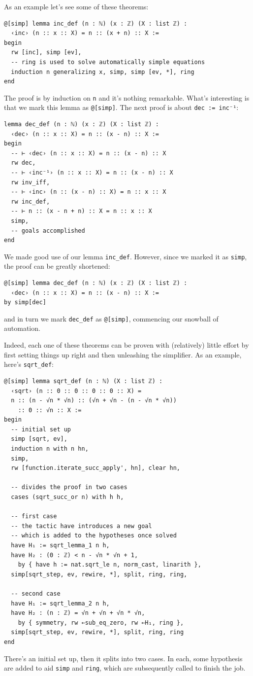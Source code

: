 \documentclass[oneside]{book}
\theoremstyle{definition}
\theoremstyle{remark}
\theoremstyle{plain}
\begin{document}
As an example let's see some of these theorems:
\begin{lstlisting}
@[simp] lemma inc_def (n : ℕ) (x : ℤ) (X : list ℤ) :
  ‹inc› (n :: x :: X) = n :: (x + n) :: X :=
begin
  rw [inc], simp [ev],
  -- ring is used to solve automatically simple equations 
  induction n generalizing x, simp, simp [ev, *], ring
end
\end{lstlisting}
The proof is by induction on \lstinline{n} and it's nothing remarkable.
What's interesting is that we mark this lemma as \lstinline{@[simp]}.
The next proof is about \lstinline{dec := inc⁻¹}:
\begin{lstlisting}
lemma dec_def (n : ℕ) (x : ℤ) (X : list ℤ) :
  ‹dec› (n :: x :: X) = n :: (x - n) :: X :=
begin
  -- ⊢ ‹dec› (n :: x :: X) = n :: (x - n) :: X
  rw dec,
  -- ⊢ ‹inc⁻¹› (n :: x :: X) = n :: (x - n) :: X
  rw inv_iff,
  -- ⊢ ‹inc› (n :: (x - n) :: X) = n :: x :: X
  rw inc_def,
  -- ⊢ n :: (x - n + n) :: X = n :: x :: X
  simp,
  -- goals accomplished
end
\end{lstlisting}
We made good use of our lemma \lstinline{inc_def}.
However, since we marked it as \lstinline{simp}, the proof can be greatly shortened:
\begin{lstlisting}
@[simp] lemma dec_def (n : ℕ) (x : ℤ) (X : list ℤ) :
  ‹dec› (n :: x :: X) = n :: (x - n) :: X :=
by simp[dec]
\end{lstlisting}
and in turn we mark \lstinline{dec_def} as \lstinline{@[simp]},
commencing our snowball of automation.

Indeed, each one of these theorems can be proven with (relatively) little effort
by first setting things up right and then unleashing the simplifier.
As an example, here's \lstinline{sqrt_def}:
\begin{lstlisting}
@[simp] lemma sqrt_def (n : ℕ) (X : list ℤ) :
  ‹sqrt› (n :: 0 :: 0 :: 0 :: 0 :: X) =
  n :: (n - √n * √n) :: (√n + √n - (n - √n * √n))
    :: 0 :: √n :: X :=
begin
  -- initial set up
  simp [sqrt, ev],
  induction n with n hn,
  simp,
  rw [function.iterate_succ_apply', hn], clear hn,

  -- divides the proof in two cases
  cases (sqrt_succ_or n) with h h,

  -- first case
  -- the tactic have introduces a new goal
  -- which is added to the hypotheses once solved
  have H₁ := sqrt_lemma_1 n h,
  have H₂ : (0 : ℤ) < n - √n * √n + 1,
    by { have h := nat.sqrt_le n, norm_cast, linarith },
  simp[sqrt_step, ev, rewire, *], split, ring, ring,

  -- second case
  have H₁ := sqrt_lemma_2 n h,
  have H₂ : (n : ℤ) = √n + √n + √n * √n,
    by { symmetry, rw ←sub_eq_zero, rw ←H₁, ring },
  simp[sqrt_step, ev, rewire, *], split, ring, ring
end
\end{lstlisting}
There's an initial set up, then it splits into two cases.
In each, some hypothesis are added to aid \lstinline{simp} and \lstinline{ring},
which are subsequently called to finish the job.
\end{document}
